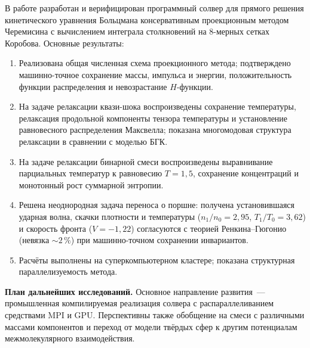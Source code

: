 \documentclass[14pt,a4paper]{extreport}
\numberwithin{equation}{chapter}
\numberwithin{figure}{chapter}
\numberwithin{table}{chapter}
\begin{document}
В работе разработан и верифицирован программный солвер для прямого решения кинетического уравнения Больцмана
консервативным проекционным методом Черемисина с вычислением интеграла столкновений на 8-мерных сетках Коробова.
Основные результаты:
\begin{enumerate}
  \item Реализована общая численная схема проекционного метода; подтверждено машинно-точное сохранение
        массы, импульса и энергии, положительность функции распределения и невозрастание $H$-функции.
  \item На задаче релаксации квази-шока воспроизведены сохранение температуры, релаксация продольной
        компоненты тензора температуры и установление равновесного распределения Максвелла; показана
        многомодовая структура релаксации в сравнении с моделью БГК.
  \item На задаче релаксации бинарной смеси воспроизведены выравнивание парциальных температур к
        равновесию $T=1{,}5$, сохранение концентраций и монотонный рост суммарной энтропии.
  \item Решена неоднородная задача переноса о поршне: получена установившаяся ударная волна, скачки
        плотности и температуры ($n_1/n_0=2{,}95$, $T_1/T_0=3{,}62$) и скорость фронта ($V=-1{,}22$)
        согласуются с теорией Ренкина--Гюгонио (невязка $\sim2\,\%$) при машинно-точном сохранении
        инвариантов.
  \item Расчёты выполнены на суперкомпьютерном кластере; показана структурная параллелизуемость метода.
\end{enumerate}

\textbf{План дальнейших исследований.}
Основное направление развития~--- промышленная компилируемая реализация солвера с распараллеливанием средствами MPI и
GPU.
Перспективны также обобщение на смеси с различными массами компонентов и переход от модели твёрдых сфер к другим
потенциалам межмолекулярного взаимодействия.
\end{document}
